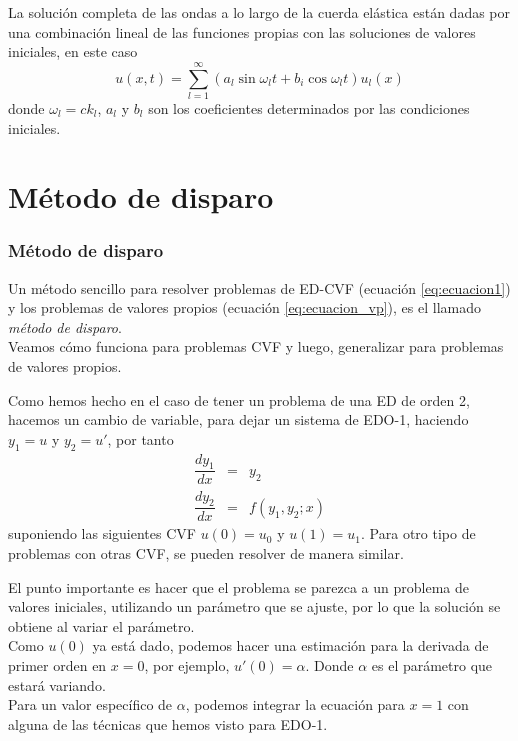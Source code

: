 \begin{frame}
La solución completa de las ondas a lo largo de la cuerda elástica están dadas por una combinación lineal de las funciones propias con las soluciones de valores iniciales, en este caso
\begin{equation}
u(x,t) = \sum_{l=1}^{\infty} (a_{l} \sin \omega_{l} t + b_{i} \cos \omega_{l} t) u_{l}(x)
\end{equation}
donde $\omega_{l} = c k_{l}$, $a_{l}$ y $b_{l}$ son los coeficientes determinados por las condiciones iniciales.
\end{frame}
\section{Método de disparo}
\begin{frame}
\frametitle{Método de disparo}
Un método sencillo para resolver problemas de ED-CVF (ecuación \ref{eq:ecuacion1}) y los problemas de valores propios (ecuación \ref{eq:ecuacion_vp}), es el llamado \emph{método de disparo}.
\\
\medskip
Veamos cómo funciona para problemas CVF y luego, generalizar para problemas de valores propios.
\end{frame}
\begin{frame}
Como hemos hecho en el caso de tener un problema de una ED de orden 2, hacemos un cambio de variable, para dejar un sistema de EDO-1, haciendo $y_{1}=u$ y $y_{2}=u'$, por tanto
\begin{eqnarray}
\dfrac{dy_{1}}{dx} &=& y_{2} \\
\dfrac{dy_{2}}{dx} &=& f(y_{1}, y_{2}; x)
\end{eqnarray}
suponiendo las siguientes CVF $u(0)= u_{0}$ y $u(1)= u_{1}$. Para otro tipo de problemas con otras CVF, se pueden resolver de manera similar.
\end{frame}
\begin{frame}
El punto importante es hacer que el problema se parezca a un problema de valores iniciales, utilizando un parámetro que se ajuste, por lo que la solución se obtiene al variar el parámetro.
\\
\medskip
Como $u(0)$ ya está dado, podemos hacer una estimación para la derivada de primer orden en $x=0$, por ejemplo, $u'(0)=\alpha$. Donde $\alpha$ es el parámetro que estará variando.
\\
\medskip
\pause
Para un valor específico de $\alpha$, podemos integrar la ecuación para $x=1$ con alguna de las técnicas que hemos visto para EDO-1.
\end{frame}
